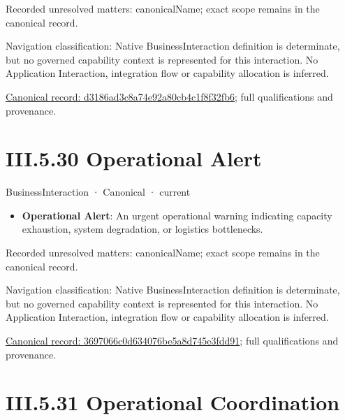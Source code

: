 {\small Recorded unresolved matters: canonicalName; exact scope remains in the canonical record.}\par
{\small Navigation classification: Native BusinessInteraction definition is determinate, but no governed capability context is represented for this interaction. No Application Interaction, integration flow or capability allocation is inferred.}\par
{\footnotesize \href{../../../../continuum/business/business-interaction/d3186ad3c8a74e92a80cb4c1f8f32fb6.md}{Canonical record: d3186ad3c8a74e92a80cb4c1f8f32fb6}; full qualifications and provenance.}\par
\section*{III.5.30 Operational Alert}
\label{navigation:III.5.30}

\label{element:3697066c0d634076be5a8d745e3fdd91}
{\small BusinessInteraction · Canonical · current}\par

\begin{itemize}


\item \textbf{Operational Alert}: An urgent operational warning indicating capacity exhaustion, system degradation, or logistics bottlenecks.

\end{itemize}

{\small Recorded unresolved matters: canonicalName; exact scope remains in the canonical record.}\par
{\small Navigation classification: Native BusinessInteraction definition is determinate, but no governed capability context is represented for this interaction. No Application Interaction, integration flow or capability allocation is inferred.}\par
{\footnotesize \href{../../../../continuum/business/business-interaction/3697066c0d634076be5a8d745e3fdd91.md}{Canonical record: 3697066c0d634076be5a8d745e3fdd91}; full qualifications and provenance.}\par
\section*{III.5.31 Operational Coordination}
\label{navigation:III.5.31}

